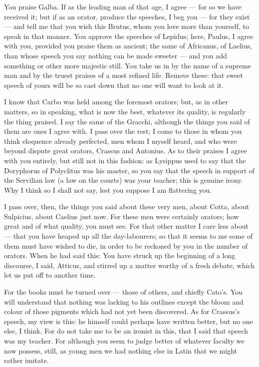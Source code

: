  You praise Galba. If as the leading man of that age, I agree — for so we have received it; but if as an orator, produce the speeches, I beg you — for they exist — and tell me that you wish this Brutus, whom you love more than yourself, to speak in that manner. You approve the speeches of Lepidus; here, Paulus, I agree with you, provided you praise them as ancient; the same of Africanus, of Laelius, than whose speech you say nothing can be made sweeter — and you add something or other more majestic still. You take us in by the name of a supreme man and by the truest praises of a most refined life. Remove these: that sweet speech of yours will be so cast down that no one will want to look at it.

 I know that Carbo was held among the foremost orators; but, as in other matters, so in speaking, what is now the best, whatever its quality, is regularly the thing praised. I say the same of the Gracchi, although the things you said of them are ones I agree with. I pass over the rest; I come to those in whom you think eloquence already perfected, men whom I myself heard, and who were beyond dispute great orators, Crassus and Antonius. As to their praises I agree with you entirely, but still not in this fashion: as Lysippus used to say that the Doryphorus of Polyclitus was his master, so you say that the speech in support of the Servilian law (a law on the courts) was your teacher; this is genuine irony. Why I think so I shall not say, lest you suppose I am flattering you.

 I pass over, then, the things you said about these very men, about Cotta, about Sulpicius, about Caelius just now. For these men were certainly orators; how great and of what quality, you must see. For that other matter I care less about — that you have heaped up all the day-labourers; so that it seems to me some of them must have wished to die, in order to be reckoned by you in the number of orators. When he had said this: You have struck up the beginning of a long discourse, I said, Atticus, and stirred up a matter worthy of a fresh debate, which let us put off to another time.

 For the books must be turned over — those of others, and chiefly Cato's. You will understand that nothing was lacking to his outlines except the bloom and colour of those pigments which had not yet been discovered. As for Crassus's speech, my view is this: he himself could perhaps have written better, but no one else, I think. For do not take me to be an ironist in this, that I said that speech was my teacher. For although you seem to judge better of whatever faculty we now possess, still, as young men we had nothing else in Latin that we might rather imitate.


